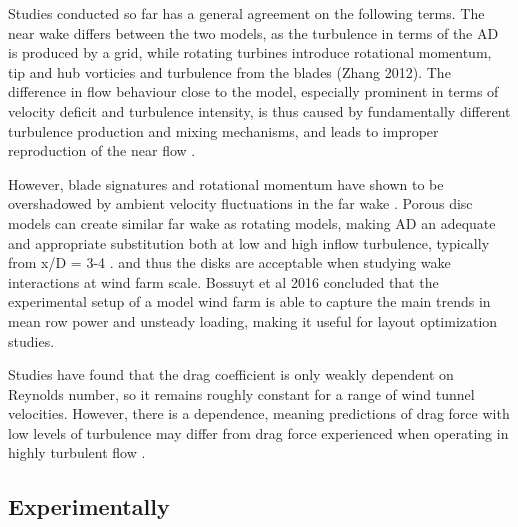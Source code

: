 Studies conducted so far has a general agreement on the following terms. The near wake differs between the two models, as the turbulence in terms of the AD is produced by a grid, while rotating turbines introduce rotational momentum, tip and hub vorticies and turbulence from the blades (Zhang 2012). The difference in flow behaviour close to the model, especially prominent in terms of velocity deficit and turbulence intensity, is thus caused by fundamentally different turbulence production and mixing mechanisms, and leads to improper reproduction of the near flow \cite{Aubrun2019}. 

However, blade signatures and rotational momentum have shown to be overshadowed by ambient velocity fluctuations in the far wake \cite{Aubrun2013}. Porous disc models can create similar far wake as rotating models, making AD an adequate and appropriate substitution both at low and high inflow turbulence, typically from x/D = 3-4 \cite{Neunaber} \cite{Aubrun2019} \cite{Aubrun2013} \cite{Lignarolo2014} \cite{Thenuissen} \cite{CampCal}. and thus the disks are acceptable when studying wake interactions at wind farm scale. Bossuyt et al 2016 concluded that the experimental setup of a model wind farm is able to capture the main trends in mean row power and unsteady loading, making it useful for layout optimization studies. 

Studies have found that the drag coefficient is only weakly dependent on Reynolds number, so it remains roughly constant for a range of wind tunnel velocities. However, there is a dependence, meaning predictions of drag force with low levels of turbulence may differ from drag force experienced when operating in highly turbulent flow \cite{Blackmore2013}.



 


\subsection{Experimentally}

